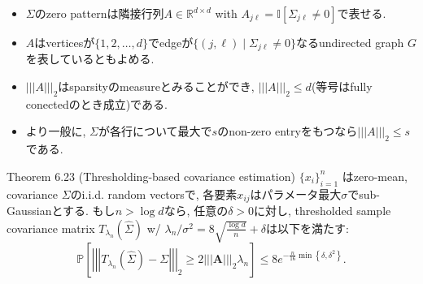 \documentclass[unicode,aspectratio=169,11pt]{beamer}
\newcommand{\bb}{\mathbb}
\begin{document}
\begin{frame}{}{}
  \begin{itemize}
    \item $\Sigma$のzero patternは隣接行列$A \in \bb{R}^{d\times d}$ with $A_{j\ell} = \bb{I}[\Sigma_{j\ell} \ne 0]$で表せる.
    \item $A$はverticesが$\{1,2,\dots,d\}$でedgeが$\{(j, \ell)\mid \Sigma_{j\ell} \ne 0\}$なるundirected graph $G$ を表しているともよめる.
    \item $|||A|||_2$はsparsityのmeasureとみることができ, $|||A|||_2 \le d$(等号はfully conectedのとき成立)である.
    \item より一般に, $\Sigma$が各行について最大で$s$のnon-zero entryをもつなら$|||A|||_2 \le s$である.
  \end{itemize}
\end{frame}

\begin{frame}{}{}
  \begin{block}{Theorem 6.23 (Thresholding-based covariance estimation)}
    $\{x_i\}_{i=1}^n$ はzero-mean, covariance $\Sigma$のi.i.d. random vectorsで,
    各要素$x_{ij}$はパラメータ最大$\sigma$でsub-Gaussianとする.
    もし$n > \log d$なら, 任意の$\delta > 0$に対し, 
    thresholded sample covariance matrix $T_{\lambda_n}(\widehat{\Sigma})$ w/ $\lambda_n/\sigma^2 = 8 \sqrt{\frac{\log d}{n}} + \delta$は以下を満たす:
    \[
      \mathbb{P}\left[\left|\left|\left|T_{\lambda_{n}}(\widehat{\Sigma})- \Sigma\right|\right|\right|_{2} \geq 2|||\mathbf{A}|||_{2} \lambda_{n}\right]
      \leq 8 e^{-\frac{n}{16} \min \left\{\delta, \delta^{2}\right\}}.
      \tag{6.53}
    \]
  \end{block}
\end{frame}
\end{document}
